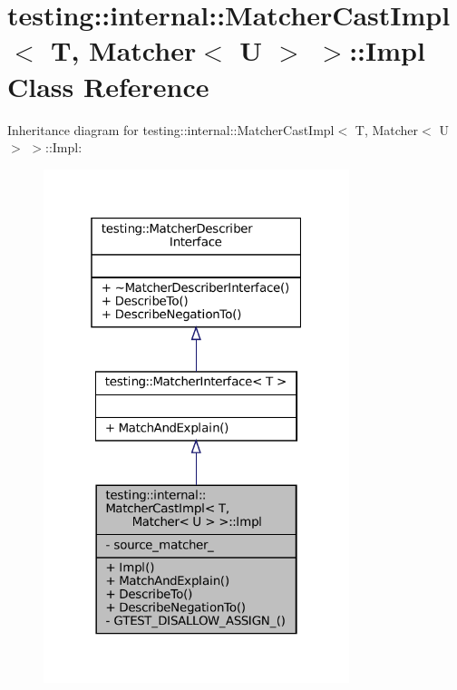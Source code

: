 \hypertarget{classtesting_1_1internal_1_1MatcherCastImpl_3_01T_00_01Matcher_3_01U_01_4_01_4_1_1Impl}{}\section{testing\+:\+:internal\+:\+:Matcher\+Cast\+Impl$<$ T, Matcher$<$ U $>$ $>$\+:\+:Impl Class Reference}
\label{classtesting_1_1internal_1_1MatcherCastImpl_3_01T_00_01Matcher_3_01U_01_4_01_4_1_1Impl}


Inheritance diagram for testing\+:\+:internal\+:\+:Matcher\+Cast\+Impl$<$ T, Matcher$<$ U $>$ $>$\+:\+:Impl\+:
\nopagebreak
\begin{figure}[H]
\begin{center}
\leavevmode
\includegraphics[width=253pt]{classtesting_1_1internal_1_1MatcherCastImpl_3_01T_00_01Matcher_3_01U_01_4_01_4_1_1Impl__inherit__graph}
\end{center}
\end{figure}


